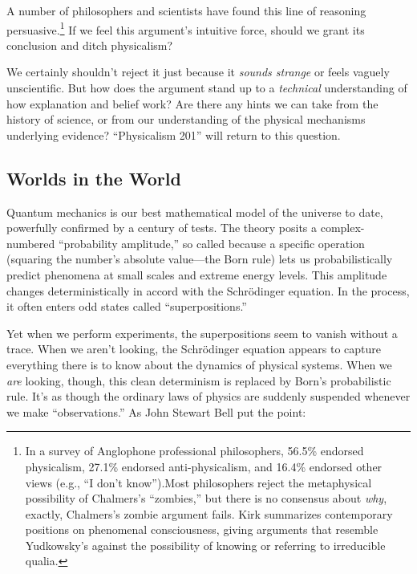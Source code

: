 {
 A number of philosophers and scientists have found this line of
reasoning persuasive.\footnote{In a survey of Anglophone professional philosophers, 56.5\%
endorsed physicalism, 27.1\% endorsed anti-physicalism, and 16.4\%
endorsed other views (e.g., ``I don't
know'').\footnotemark Most philosophers reject
the metaphysical possibility of Chalmers's
``zombies,'' but there is no
consensus about \textit{why}, exactly, Chalmers's
zombie argument fails. Kirk summarizes contemporary positions on
phenomenal consciousness, giving arguments that resemble
Yudkowsky's against the possibility of knowing or
referring to irreducible qualia.\footnotemark{}}
\footnext{}\footnext{}If we feel this
argument's intuitive force, should we grant its
conclusion and ditch physicalism?}

{
 We certainly shouldn't reject it just because it
\textit{sounds strange} or feels vaguely unscientific. But how does the
argument stand up to a \textit{technical} understanding of how
explanation and belief work? Are there any hints we can take from the
history of science, or from our understanding of the physical
mechanisms underlying evidence? ``Physicalism
201'' will return to this question.}


\subsection{Worlds in the World}

{
 Quantum mechanics is our best mathematical model of the universe
to date, powerfully confirmed by a century of tests. The theory posits
a complex-numbered ``probability
amplitude,'' so called because a specific operation
(squaring the number's absolute value---the Born rule)
lets us probabilistically predict phenomena at small scales and extreme
energy levels. This amplitude changes deterministically in accord with
the Schrödinger equation. In the process, it often enters odd states
called ``superpositions.''}

{
 Yet when we perform experiments, the superpositions seem to vanish
without a trace. When we aren't looking, the
Schrödinger equation appears to capture everything there is to know
about the dynamics of physical systems. When we \textit{are} looking,
though, this clean determinism is replaced by Born's
probabilistic rule. It's as though the ordinary laws of
physics are suddenly suspended whenever we make
``observations.'' As John Stewart
Bell put the point:}

